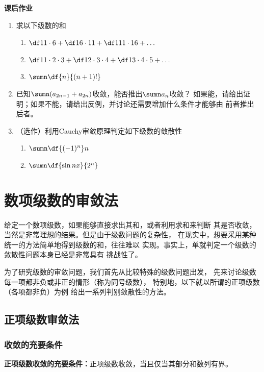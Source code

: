\begin{ext}
	{\bf 课后作业}
	\begin{enumerate}
	  \item 求以下级数的和
	  \begin{enumerate}[(1)]
	    \item $\df1{1\cdot6}+\df1{6\cdot11}+\df1{11\cdot16}+\ldots$
	    \item $\df1{1\cdot2\cdot3}+\df1{2\cdot3\cdot4}+\df1{3\cdot4\cdot5}+\ldots$
	    \item $\sumn\df{n}{(n+1)!}$
	  \end{enumerate}
	  \item 已知$\sumn(a_{2n-1}+a_{2n})$收敛，能否推出$\sumn a_n$收敛？
	  如果能，请给出证明；如果不能，请给出反例，并讨论还需要增加什么条件才能够由
	  前者推出后者。
	  \item （选作）利用Cauchy审敛原理判定如下级数的敛散性
	  \begin{enumerate}[(1)]
	    \item $\sumn\df{(-1)^{n}}n$
	    \item $\sumn\df{\sin nx}{2^n}$
	  \end{enumerate}
	\end{enumerate}
\end{ext}

\section{数项级数的审敛法}

给定一个数项级数，如果能够直接求出其和，或者利用求和来判断
其是否收敛，当然是非常理想的结果。但是由于级数问题的复杂性，
在现实中，想要采用某种统一的方法简单地得到级数的和，往往难以
实现。事实上，单就判定一个级数的敛散性问题本身已经是非常具有
挑战性了。

为了研究级数的审敛问题，我们首先从比较特殊的级数问题出发，
先来讨论级数每一项都非负或非正的情形（称为{\kaishu 同号级数}），
特别地，以下就以所谓的{\kaishu 正项级数}（各项都非负）为例
给出一系列判别敛散性的方法。

\subsection{正项级数审敛法}

\subsubsection{收敛的充要条件}

\begin{thx}
	{\bf 正项级数收敛的充要条件：}正项级数收敛，当且仅当其部分和数列有界。
\end{thx}

